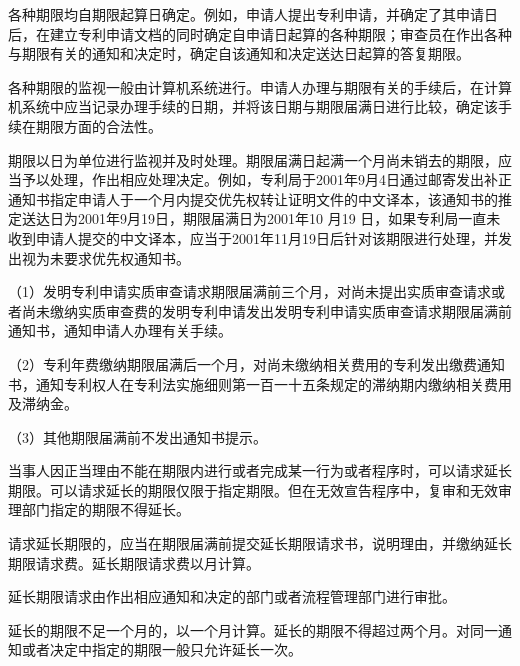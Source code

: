 各种期限均自期限起算日确定。例如，申请人提出专利申请，并确定了其申请日后，在建立专利申请文档的同时确定自申请日起算的各种期限；审查员在作出各种与期限有关的通知和决定时，确定自该通知和决定送达日起算的答复期限。

各种期限的监视一般由计算机系统进行。申请人办理与期限有关的手续后，在计算机系统中应当记录办理手续的日期，并将该日期与期限届满日进行比较，确定该手续在期限方面的合法性。

期限以日为单位进行监视并及时处理。期限届满日起满一个月尚未销去的期限，应当予以处理，作出相应处理决定。例如，专利局于2001年9月4日通过邮寄发出补正通知书指定申请人于一个月内提交优先权转让证明文件的中文译本，该通知书的推定送达日为2001年9月19日，期限届满日为2001年10 月19 日，如果专利局一直未收到申请人提交的中文译本，应当于2001年11月19日后针对该期限进行处理，并发出视为未要求优先权通知书。

{\setlength{\parindent}{17.1bp}（1）发明专利申请实质审查请求期限届满前三个月，对尚未提出实质审查请求或者尚未缴纳实质审查费的发明专利申请发出发明专利申请实质审查请求期限届满前通知书，通知申请人办理有关手续。\par}

{\setlength{\parindent}{17.1bp}（2）专利年费缴纳期限届满后一个月，对尚未缴纳相关费用的专利发出缴费通知书，通知专利权人在专利法实施细则第一百一十五条规定的滞纳期内缴纳相关费用及滞纳金。\par}

{\setlength{\parindent}{17.1bp}（3）其他期限届满前不发出通知书提示。\par}

当事人因正当理由不能在期限内进行或者完成某一行为或者程序时，可以请求延长期限。可以请求延长的期限仅限于指定期限。但在无效宣告程序中，复审和无效审理部门指定的期限不得延长。

请求延长期限的，应当在期限届满前提交延长期限请求书，说明理由，并缴纳延长期限请求费。延长期限请求费以月计算。

延长期限请求由作出相应通知和决定的部门或者流程管理部门进行审批。

延长的期限不足一个月的，以一个月计算。延长的期限不得超过两个月。对同一通知或者决定中指定的期限一般只允许延长一次。


